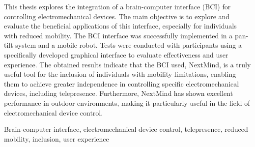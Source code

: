 \newpage 
\vspace*{200px}
\thispagestyle{empty}

\begin{abstract_en}
{\em

This thesis explores the integration of a brain-computer interface (BCI) for controlling electromechanical devices. The main objective is to explore and evaluate the beneficial applications of this interface, especially for individuals with reduced mobility. The BCI interface was successfully implemented in a pan-tilt system and a mobile robot. Tests were conducted with participants using a specifically developed graphical interface to evaluate effectiveness and user experience. The obtained results indicate that the BCI used, NextMind, is a truly useful tool for the inclusion of individuals with mobility limitations, enabling them to achieve greater independence in controlling specific electromechanical devices, including telepresence. Furthermore, NextMind has shown excellent performance in outdoor environments, making it particularly useful in the field of electromechanical device control.
}
\bigskip

\begin{keywords}

Brain-computer interface, electromechanical device control, telepresence, reduced mobility, inclusion, user experience
\end{keywords}

\end{abstract_en}